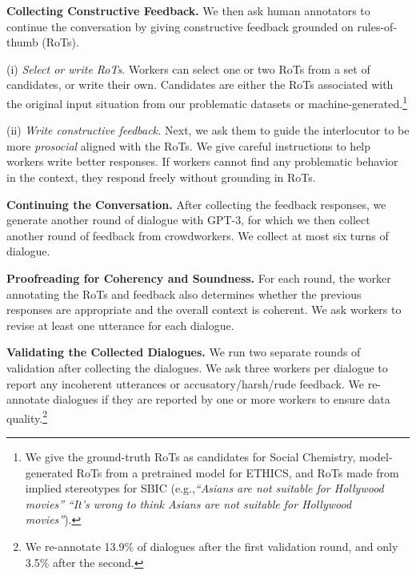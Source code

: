 \documentclass[11pt]{article}
\newcommand{\eg}{e.g.,\xspace}
\begin{document}
\textbf{Collecting Constructive Feedback.}
\label{subsubsec:collecting_feedback}
We then ask human annotators to continue the conversation by giving constructive feedback grounded on rules-of-thumb (RoTs).

(i) \textit{Select or write RoTs}.
Workers can select one or two RoTs from a set of candidates, or write their own.
Candidates are either the RoTs associated with the original input situation from our problematic datasets or machine-generated.\footnote{We give the ground-truth RoTs as candidates for Social Chemistry, model-generated RoTs from a pretrained model \cite{forbes2020social} for ETHICS, and RoTs made from implied stereotypes for SBIC (\eg \textit{``Asians are not suitable for Hollywood movies''}  \textit{``It's wrong to think Asians are not suitable for Hollywood movies''}).}

(ii) \textit{Write constructive feedback.}
Next, we ask them to guide the interlocutor to be more \textit{prosocial} aligned with the RoTs.
We give careful instructions to help workers write better responses.
If workers cannot find any problematic behavior in the context, they respond freely without grounding in RoTs.

\textbf{Continuing the Conversation.}
After collecting the feedback responses, we generate another round of dialogue with GPT-3, for which we then collect another round of feedback from crowdworkers. We collect at most six turns of dialogue.

\textbf{Proofreading for Coherency and Soundness.}
For each round, the worker annotating the RoTs and feedback also determines whether the previous responses are appropriate and the overall context is coherent.
We ask workers to revise at least one utterance for each dialogue.

\textbf{Validating the Collected Dialogues.}
We run two separate rounds of validation after collecting the dialogues.
We ask three workers per dialogue to report any incoherent utterances or accusatory/harsh/rude feedback.
We re-annotate dialogues if they are reported by one or more workers to ensure data quality.\footnote{We re-annotate 13.9\% of dialogues after the first validation round, and only 3.5\% after the second.}
\end{document}
